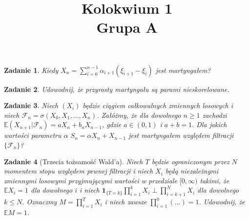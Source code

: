 \documentclass{mwart}
\title{Kolokwium 1\\Grupa A}
\newtheorem{zd}{Zadanie}
\begin{document}

\maketitle

\begin{zd}
Kiedy $X_n = \sum_{i=0}^{n-1}\alpha_{i+1}(\xi_{i+1} - \xi_i)$ jest martyngałem?
\end{zd}

\begin{zd}
Udowodnij, że przyrosty martyngału są parami nieskorelowane.
\end{zd}

\begin{zd}
Niech $(X_i)$ będzie ciągiem całkowalnych zmiennych losowych i niech $\mathcal{F}_n = \sigma(X_0, X_1, \dots, X_n)$. Załóżmy, że dla dowolnego $n \geq 1$ zachodzi $\mathbb{E}(X_{n+1}|\mathcal{F}_n) = aX_n + b_nX_{n-1}$, gdzie $a\in (0, 1)$ i $a+b=1$. Dla jakich wartości parametru $\alpha$ $S_n = \alpha X_n + X_{n-1}$ jest martyngałem względem filtracji $\{\mathcal{F}_n\}$?
\end{zd}

\begin{zd}[Trzecia tożsamość Wald'a]
Niech $T$ będzie ograniczonym przez $N$ momentem stopu względem pewnej filtracji i niech $X_i$ będą niezależnymi zmiennymi losowymi przyjmującymi wartości w przedziale $[0, \infty )$ takimi, że $\mathbb{E}X_i = 1$ dla dowolnego $i$ i niech $\pmb{1}_{\{T=k\}}\prod_{i=1}^kX_i \perp \prod_{i=k+1}^NX_i$ dla dowolnego $k \leq N$. Oznaczmy $M = \prod_{i=1}^TX_i$ i niech zawsze $\prod_{i=1}^0(\dots ) = 1$. Udowodnij, że $\mathbb{E}M =1$.
\end{zd}
\end{document}
